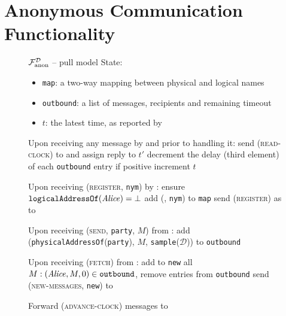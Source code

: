 \section{Anonymous Communication Functionality}
  \label{sec:anonfunc}
  \begin{figure}[H]
    \begin{systembox}{$\mathcal{F}_{\mathrm{anon}}^{\mathcal{D}}$ -- pull model} 
      State:
      \begin{itemize}
        \item \texttt{map}: a two-way mapping between physical and logical names
        \item \texttt{outbound}: a list of messages, recipients and remaining
        timeout
        \item $t$: the latest time, as reported by \gFclock
      \end{itemize}
      \begin{algorithmic}[1]
        \State Upon receiving any message by \alice and prior to handling it:
        \Indent
          \State send (\textsc{read-clock}) to \gFclock and assign reply to $t'$
            \State decrement the delay (third element) of each \texttt{outbound}
            entry if positive
            \State increment $t$
          \EndIf
        \EndIndent
        \Statex

        \State Upon receiving (\textsc{register}, \texttt{nym}) by \alice:
        \Indent
          \State ensure $\mathtt{logicalAddressOf}(\mathit{Alice}) = \bot$
          \State add (\alice, \texttt{nym}) to \texttt{map}
          \State send (\textsc{register}) as \alice to \gFclock
        \EndIndent
        \Statex

        \State Upon receiving (\textsc{send}, \texttt{party}, $M$) from \alice:
        \Indent
          \State add (\texttt{physicalAddressOf}(\texttt{party}), $M$,
          \texttt{sample}($\mathcal{D}$)) to \texttt{outbound} 
        \EndIndent
        \Statex

        \State Upon receiving (\textsc{fetch}) from \alice:
        \Indent
          \State add to \texttt{new} all $M: (\mathit{Alice}, M, 0) \in
          \mathtt{outbound}$, remove entries from \texttt{outbound}
          \State send (\textsc{new-messages}, \texttt{new}) to \alice
        \EndIndent
        \Statex

        \State Forward (\textsc{advance-clock}) messages to \gFclock
      \end{algorithmic}
    \end{systembox}
    \caption{}
    \label{alg:anonfunc:pull}
  \end{figure}

